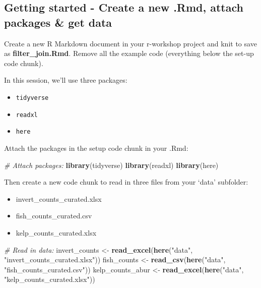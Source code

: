 \documentclass[]{book}
\newenvironment{Shaded}{\begin{snugshade}}{\end{snugshade}}
\newcommand{\CommentTok}[1]{\textcolor[rgb]{0.56,0.35,0.01}{\textit{#1}}}
\newcommand{\KeywordTok}[1]{\textcolor[rgb]{0.13,0.29,0.53}{\textbf{#1}}}
\newcommand{\NormalTok}[1]{#1}
\newcommand{\StringTok}[1]{\textcolor[rgb]{0.31,0.60,0.02}{#1}}
\providecommand{\tightlist}{%
  \setlength{\itemsep}{0pt}\setlength{\parskip}{0pt}}
\begin{document}
\hypertarget{getting-started---create-a-new-.rmd-attach-packages-get-data-1}{%
\subsection{Getting started - Create a new .Rmd, attach packages \& get data}\label{getting-started---create-a-new-.rmd-attach-packages-get-data-1}}

Create a new R Markdown document in your r-workshop project and knit to save as \textbf{filter\_join.Rmd}. Remove all the example code (everything below the set-up code chunk).

In this session, we'll use three packages:

\begin{itemize}
\tightlist
\item
  \texttt{tidyverse}
\item
  \texttt{readxl}
\item
  \texttt{here}
\end{itemize}

Attach the packages in the setup code chunk in your .Rmd:

\begin{Shaded}
\begin{Highlighting}[]
\CommentTok{# Attach packages:}
\KeywordTok{library}\NormalTok{(tidyverse)}
\KeywordTok{library}\NormalTok{(readxl)}
\KeywordTok{library}\NormalTok{(here)}
\end{Highlighting}
\end{Shaded}

Then create a new code chunk to read in three files from your `data' subfolder:

\begin{itemize}
\tightlist
\item
  invert\_counts\_curated.xlsx
\item
  fish\_counts\_curated.csv
\item
  kelp\_counts\_curated.xlsx
\end{itemize}

\begin{Shaded}
\begin{Highlighting}[]
\CommentTok{# Read in data: }
\NormalTok{invert_counts <-}\StringTok{ }\KeywordTok{read_excel}\NormalTok{(}\KeywordTok{here}\NormalTok{(}\StringTok{"data"}\NormalTok{, }\StringTok{"invert_counts_curated.xlsx"}\NormalTok{))}
\NormalTok{fish_counts <-}\StringTok{ }\KeywordTok{read_csv}\NormalTok{(}\KeywordTok{here}\NormalTok{(}\StringTok{"data"}\NormalTok{, }\StringTok{"fish_counts_curated.csv"}\NormalTok{))}
\NormalTok{kelp_counts_abur <-}\StringTok{ }\KeywordTok{read_excel}\NormalTok{(}\KeywordTok{here}\NormalTok{(}\StringTok{"data"}\NormalTok{, }\StringTok{"kelp_counts_curated.xlsx"}\NormalTok{))}
\end{Highlighting}
\end{Shaded}
\end{document}
